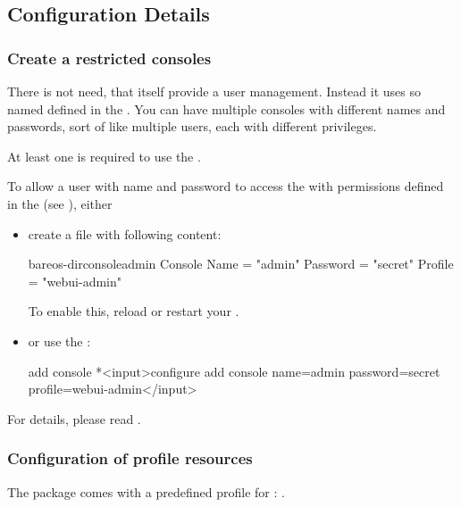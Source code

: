 \subsection{Configuration Details}


\subsubsection{Create a restricted consoles}
    \label{sec:webui-console}

There is not need, that \bareosWebui itself provide a user management.
Instead it uses so named  defined in the \bareosDir.
You can have multiple consoles with different names and passwords, sort of like multiple users, each with different privileges.

At least one  is required to use the \bareosWebui.

To allow a user with name  and password  to access the \bareosDir
with permissions defined in the  (see ),
either
\begin{itemize}
\item create a file  with following content:
\begin{bareosConfigResource}{bareos-dir}{console}{admin}
Console {
  Name = "admin"
  Password = "secret"
  Profile = "webui-admin"
}
\end{bareosConfigResource}

To enable this, reload or restart your \bareosDir.
\item or use the :
\begin{bconsole}{add console}
*<input>configure add console name=admin password=secret profile=webui-admin</input>
\end{bconsole}
\end{itemize}


For details, please read .



\subsubsection{Configuration of profile resources}
    \label{sec:webui-profile}

The package  comes with a predefined profile for \bareosWebui: .


